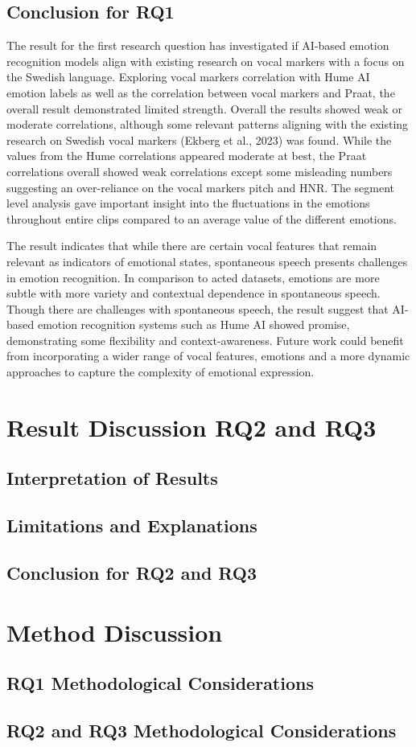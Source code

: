 \subsection{Conclusion for RQ1}
The result for the first research question has investigated if AI-based emotion recognition models align with existing research on vocal markers with a focus on the Swedish language.
Exploring vocal markers correlation with Hume AI emotion labels as well as the correlation between vocal markers and Praat, the overall result demonstrated limited strength.
Overall the results showed weak or moderate correlations, although some relevant patterns aligning with the existing research on Swedish vocal markers (Ekberg et al., 2023) was found.
While the values from the Hume correlations appeared moderate at best, the Praat correlations overall showed weak correlations except some misleading numbers suggesting an over-reliance on the vocal markers pitch and HNR.
The segment level analysis gave important insight into the fluctuations in the emotions throughout entire clips compared to an average value of the different emotions.

The result indicates that while there are certain vocal features that remain relevant as indicators of emotional states, spontaneous speech presents challenges in emotion recognition. In comparison to acted datasets, emotions are more subtle with more variety and contextual dependence in spontaneous speech.
Though there are challenges with spontaneous speech, the result suggest that AI-based emotion recognition systems such as Hume AI showed promise, demonstrating some flexibility and context-awareness.
Future work could benefit from incorporating a wider range of vocal features, emotions and a more dynamic approaches to capture the complexity of emotional expression.


\section{Result Discussion RQ2 and RQ3}

\subsection{Interpretation of Results}
\subsection{Limitations and Explanations}
\subsection{Conclusion for RQ2 and RQ3}

\section{Method Discussion}

\subsection{RQ1 Methodological Considerations}


\subsection{RQ2 and RQ3 Methodological Considerations}
